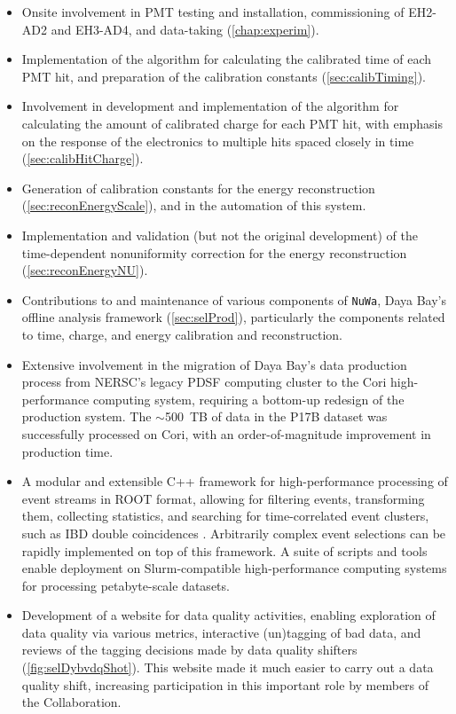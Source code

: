 \documentclass[../thesis.tex]{subfiles}
\begin{document}
\begin{itemize}
  \item Onsite involvement in PMT testing and installation, commissioning of EH2-AD2 and EH3-AD4, and data-taking (\autoref{chap:experim}).
  \item Implementation of the algorithm for calculating the calibrated time of each PMT hit, and preparation of the calibration constants (\autoref{sec:calibTiming}).
  \item Involvement in development and implementation of the algorithm for calculating the amount of calibrated charge for each PMT hit, with emphasis on the response of the electronics to multiple hits spaced closely in time (\autoref{sec:calibHitCharge}).
  \item Generation of calibration constants for the energy reconstruction (\autoref{sec:reconEnergyScale}), and in the automation of this system.
  \item Implementation and validation (but not the original development) of the time-dependent nonuniformity correction for the energy reconstruction (\autoref{sec:reconEnergyNU}).
  \item Contributions to and maintenance of various components of \texttt{NuWa}, Daya Bay's offline analysis framework (\autoref{sec:selProd}), particularly the components related to time, charge, and energy calibration and reconstruction.
  \item Extensive involvement in the migration of Daya Bay's data production process from NERSC's legacy PDSF computing cluster to the Cori high-performance computing system, requiring a bottom-up redesign of the production system. The $\sim$500~TB of data in the P17B dataset was successfully processed on Cori, with an order-of-magnitude improvement in production time.
  \item A modular and extensible C++ framework for high-performance processing of event streams in ROOT format, allowing for filtering events, transforming them, collecting statistics, and searching for time-correlated event clusters, such as IBD double coincidences \cite{SelectorFramework}. Arbitrarily complex event selections can be rapidly implemented on top of this framework. A suite of scripts and tools enable deployment on Slurm-compatible high-performance computing systems for processing petabyte-scale datasets.
  \item Development of a website \cite{dybvdq} for data quality activities, enabling exploration of data quality via various metrics, interactive (un)tagging of bad data, and reviews of the tagging decisions made by data quality shifters (\autoref{fig:selDybvdqShot}). This website made it much easier to carry out a data quality shift, increasing participation in this important role by members of the Collaboration.

\end{itemize}
\end{document}
